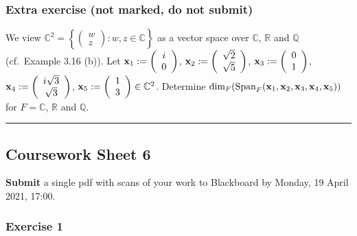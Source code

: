 \documentclass[
  12pt,
  a4paper,
  twoside]{article}
\theoremstyle{plain}
\theoremstyle{definition}
\begin{document}
\hypertarget{extra-exercise-not-marked-do-not-submit}{%
\subsubsection*{Extra exercise (not marked, do not submit)}\label{extra-exercise-not-marked-do-not-submit}}

We view \(\mathbb{C}^2 = \left\{\left(\begin{array}{c} w \\ z \end{array}\right): w, z \in \mathbb{C}\right\}\) as a vector space
over \(\mathbb{C}\), \(\mathbb{R}\) and \(\mathbb{Q}\) (cf.~Example 3.16 (b)). Let
\({\bf x}_1:= \left(\begin{array}{c} i \\ 0 \end{array}\right)\),
\({\bf x}_2:= \left(\begin{array}{c} \sqrt{2} \\ \sqrt{5} \end{array}\right)\),
\({\bf x}_3:= \left(\begin{array}{c} 0 \\ 1 \end{array}\right)\),
\({\bf x}_4:= \left(\begin{array}{c} i\sqrt{3} \\ \sqrt{3} \end{array}\right)\),
\({\bf x}_5:= \left(\begin{array}{c} 1 \\ 3 \end{array}\right) \in \mathbb{C}^2\).
Determine
\(\textrm{dim}_F(\textrm{Span}_F({\bf x}_1, {\bf x}_2, {\bf x}_3, {\bf x}_4, {\bf x}_5))\) for \(F= \mathbb{C}\), \(\mathbb{R}\) and \(\mathbb{Q}\).

\begin{center}\rule{0.5\linewidth}{0.5pt}\end{center}

\hypertarget{coursework-sheet-6}{%
\subsection{Coursework Sheet 6}\label{coursework-sheet-6}}

\textbf{Submit} a single pdf with scans of your work to Blackboard by Monday, 19 April 2021, 17:00.

\hypertarget{exercise-1-6}{%
\subsubsection*{Exercise 1}\label{exercise-1-6}}
\end{document}
